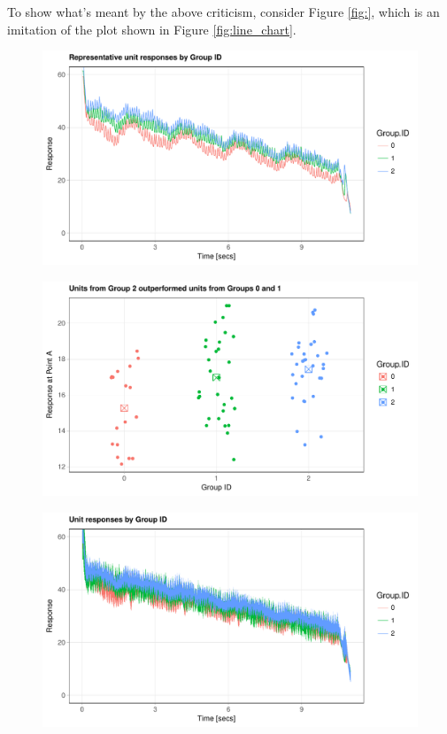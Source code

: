 \documentclass[11pt,a4paper,article]{memoir} %
\begin{document}
To show what's meant by the above criticism, consider Figure \ref{fig:}, which is an imitation of the plot shown in Figure \ref{fig:line_chart}. 

\begin{figure}
\includegraphics[width=\textwidth]{thinned_line_chart.pdf}
\end{figure}

\begin{figure}
\includegraphics[width=\textwidth]{strip_plot.pdf}
\end{figure}

\begin{figure}
\includegraphics[width=\textwidth]{imitation_line_chart.pdf}
\end{figure}
\end{document}
